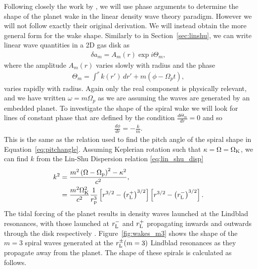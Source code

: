 Following closely the work by \citet{ogilvie2002}, we will use phase arguments to determine the shape of the planet wake in the linear density wave theory paradigm.
However we will not follow exactly their original derivation.
We will instead obtain the more general form for the wake shape.
Similarly to in Section~\ref{sec:linshu}, we can write linear wave quantities in a 2D gas disk as 
\begin{align}
    \delta a_m = A_m(r) \exp{i \Theta_m},
\end{align}
where the amplitude $A_m(r)$ varies slowly with radius and the phase
\begin{align}
    \Theta_m = \int^r k(r') \, dr' + m (\phi - \Omega_p t),
\end{align}
varies rapidly with radius. 
Again only the real component is physically relevant, and we have written $\omega = m \Omega_p$ as we are assuming the waves are generated by an embedded planet.
To investigate the shape of the spiral wake we will look for lines of constant phase that are defined by the condition $\frac{d\Theta_m}{dr} = 0$ and so 
\begin{align}
    \frac{d\phi}{dr} = - \frac{k}{m}. \label{eq:spiral_km}
\end{align}
This is the same as the relation used to find the pitch angle of the spiral shape in Equation~\eqref{eq:pitchangle}.
Assuming Keplerian rotation such that $\kappa=\Omega=\Omega_{\rm K}$, we can find $k$ from the Lin-Shu Dispersion relation \eqref{eq:lin_shu_disp}
\begin{align}
    k^2 &= \frac{m^2 \left( \Omega - \Omega_{\rm p} \right)^2 - \kappa^2}{c^2}, \\
    &= \frac{m^2 \Omega_{\rm K}^2}{c^2} \frac{1}{r_{\rm p}^3} \left[ r^{3/2} - \left( r_{\rm L}^+ \right)^{3/2} \right] \left[ r^{3/2} - \left( r_{\rm L}^- \right)^{3/2} \right].
\end{align}
The tidal forcing of the planet results in density waves launched at the Lindblad resonances, with those launched at $r_{\rm L}^-$ and $r_{\rm L}^+$ propagating inwards and outwards through the disk respectively \citep{goldreich1979,goldreich1980}.
Figure~\ref{fig:wakes_m3} shows the shape of the $m=3$ spiral waves generated at the $r_{\rm L}^\pm (m=3)$ Lindblad resonances as they propagate away from the planet.
The shape of these spirals is calculated as follows.

